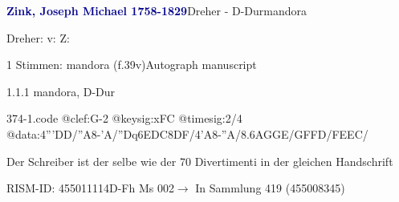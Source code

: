 \documentclass[twocolumn, 12pt]{book}
\begin{document}
\par \vspace{16pt} \textcolor{darkblue}{\textbf{Zink, Joseph Michael  1758-1829}}\hfillplus{\textbf{[374]}}\newline Dreher - D-Dur\newline mandora
\par \begin{itshape}[f.39v, at left:] Dreher: v: Z:\end{itshape} 
\par \textcolor{darkblue}{}  1 Stimmen: mandora  (f.39v)\newline Autograph manuscript
\par 1.1.1  mandora, D-Dur  
\begin{filecontents*}{374-1.code}
@clef:G-2
@keysig:xFC
@timesig:2/4
@data:4'''DD/''A8-'A/{''Dq6EDC}{8DF}/4'A8-''A/{8.6AGGE}/{GFFD}/{FEEC}/
\end{filecontents*}
\newline %
\par Der Schreiber ist der selbe wie der 70 Divertimenti in der gleichen Handschrift
\par RISM-ID: 455011114\newline D-Fh  Ms 002\newline $\rightarrow$ In Sammlung 419 (455008345)
      
\end{document}
